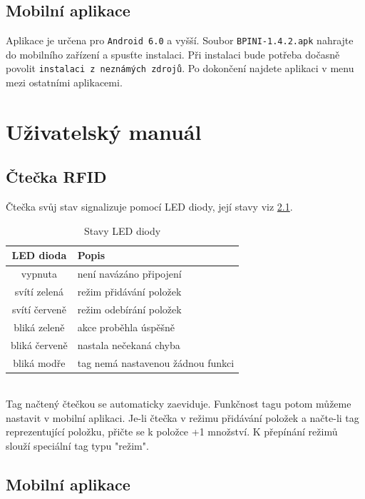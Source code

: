 \documentclass[czech,BP]{thesiskiv}
\begin{document}
	\section{Mobilní aplikace}
	

Aplikace je určena pro \texttt{Android 6.0} a vyšší.	
Soubor \texttt{BPINI-1.4.2.apk} nahrajte do mobilního zařízení a spusťte instalaci.
Při instalaci bude potřeba dočasně povolit \texttt{instalaci z neznámých zdrojů}.
Po dokončení najdete aplikaci v menu mezi ostatními aplikacemi.


\chapter{Uživatelský manuál}

	\section{Čtečka RFID}
Čtečka svůj stav signalizuje pomocí LED diody, její stavy viz \ref{table:led_states}.

\begin{table}[ht]
\centering
\begin{tabular}{ c | p{6cm} }
\textbf{LED dioda} & \textbf{Popis} \\ \hline\hline
vypnuta & není navázáno připojení \\ \hline  
svítí zelená & režim přidávání položek \\ \hline
svítí červeně & režim odebírání položek \\ \hline
bliká zeleně & akce proběhla úspěšně \\ \hline
bliká červeně & nastala nečekaná chyba  \\ \hline
bliká modře & tag nemá nastavenou žádnou funkci  \\ \hline
\end{tabular}
\caption{Stavy LED diody}
\label{table:led_states}
\end{table}
\ \\
Tag načtený čtečkou se automaticky zaeviduje. Funkčnost tagu potom můžeme nastavit v mobilní aplikaci.
Je-li čtečka v režimu přidávání položek a načte-li tag reprezentující položku, přičte se k položce +1 množství.
K přepínání režimů slouží speciální tag typu "režim".



	\section{Mobilní aplikace}
	
\end{document}
